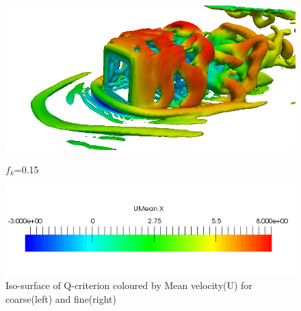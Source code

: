 \begin{figure}[H]
\begin{minipage}[b]{0.5\linewidth}
\end{minipage}
\begin{minipage}[b]{0.5\linewidth}
\includegraphics[scale=0.25]{figure/fine/one/iso.png}
\caption*{$f_k$=0.15}
\end{minipage}
\begin{center}
\includegraphics[scale=0.5]{figure/iso_scale.png}
\end{center}
\caption{Iso-surface of Q-criterion coloured by Mean velocity(U) for coarse(left) and fine(right)}
\end{figure}



